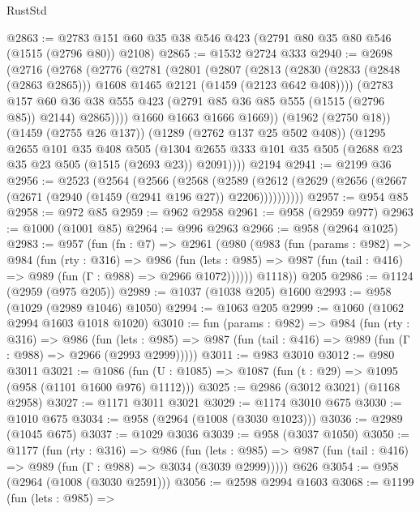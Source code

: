 \begin{lexlean}{RustStd}
\begin{coremodule}
@2863 := @2783 @151 @60 @35 @38 @546 @423 (@2791 @80 @35 @80 @546 (@1515 (@2796 @80)) @2108)
@2865 := @1532 @2724 @333
@2940 := @2698
    (@2716
      (@2768
        (@2776
          (@2781
            (@2801
              (@2807
                (@2813
                  (@2830 (@2833 (@2848 (@2863 @2865))) @1608 @1465 @2121 (@1459 (@2123 @642 @408))))
                (@2783
                  @157
                  @60
                  @36
                  @38
                  @555
                  @423
                  (@2791 @85 @36 @85 @555 (@1515 (@2796 @85)) @2144)
                  @2865))))
          @1660
          @1663
          @1666
          @1669))
      (@1962 (@2750 @18))
      (@1459 (@2755 @26 @137))
      (@1289 (@2762 @137 @25 @502 @408))
      (@1295
        @2655
        @101
        @35
        @408
        @505
        (@1304 @2655 @333 @101 @35 @505 (@2688 @23 @35 @23 @505 (@1515 (@2693 @23)) @2091))))
    @2194
@2941 := @2199 @36
@2956 := @2523
    (@2564
      (@2566
        (@2568
          (@2589 (@2612 (@2629 (@2656 (@2667 (@2671 (@2940 (@1459 (@2941 @196 @27)) @2206))))))))))
@2957 := @954 @85
@2958 := @972 @85
@2959 := @962 @2958
@2961 := @958 (@2959 @977)
@2963 := @1000 (@1001 @85)
@2964 := @996 @2963
@2966 := @958 (@2964 @1025)
@2983 := @957
    (fun (fn : @7) =>
    @2961
      (@980
        (@983
          (fun (params : @982) =>
          @984
            (fun (rty : @316) =>
            @986
              (fun (lets : @985) =>
              @987 (fun (tail : @416) => @989 (fun (Γ : @988) => @2966 @1072))))))
        @1118))
    @205
@2986 := @1124 (@2959 (@975 @205))
@2989 := @1037 (@1038 @205) @1600
@2993 := @958 (@1029 (@2989 @1046) @1050)
@2994 := @1063 @205
@2999 := @1060 (@1062 @2994 @1603 @1018 @1020)
@3010 := fun (params : @982) =>
  @984
    (fun (rty : @316) =>
    @986
      (fun (lets : @985) =>
      @987 (fun (tail : @416) => @989 (fun (Γ : @988) => @2966 (@2993 @2999)))))
@3011 := @983 @3010
@3012 := @980 @3011
@3021 := @1086 (fun (U : @1085) => @1087 (fun (t : @29) => @1095 (@958 (@1101 @1600 @976) @1112)))
@3025 := @2986 (@3012 @3021) (@1168 @2958)
@3027 := @1171 @3011 @3021
@3029 := @1174 @3010 @675
@3030 := @1010 @675
@3034 := @958 (@2964 (@1008 (@3030 @1023)))
@3036 := @2989 (@1045 @675)
@3037 := @1029 @3036
@3039 := @958 (@3037 @1050)
@3050 := @1177
    (fun (rty : @316) =>
    @986
      (fun (lets : @985) =>
      @987 (fun (tail : @416) => @989 (fun (Γ : @988) => @3034 (@3039 @2999)))))
    @626
@3054 := @958 (@2964 (@1008 (@3030 @2591)))
@3056 := @2598 @2994 @1603
@3068 := @1199
    (fun (lets : @985) =>

\end{coremodule}
\end{lexlean}
